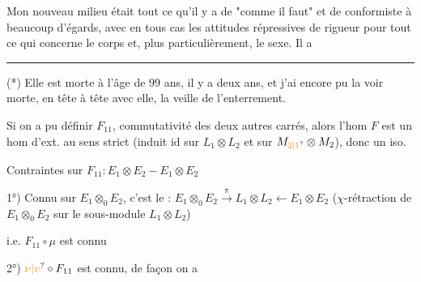 Mon nouveau milieu était tout ce qu'il y a de "comme il faut" et de conformiste à beaucoup d'égards, avec en tous cas les attitudes répressives de rigueur pour tout ce qui concerne le corps et, plus particulièrement, le sexe. Il a 

\noindent\rule{5em}{0.4pt}\par
(*) Elle est morte à l'âge de 99 ans, il y a deux ans, et j'ai encore pu la voir morte, en tête à tête avec elle, la veille de l'enterrement.


Si on a pu définir $F_{11}$,  commutativité des deux autres carrés, alors l'hom $F$ est un hom d'ext. au sens strict (induit $\mathrm{id}$ sur $L_1\otimes L_2$ et sur $M_{\unsure{2|1}}\otimes M_2$), donc  un iso.

Contraintes sur $F_{11}:E_1\otimes E_2 - E_1\otimes E_2$ 

1°) Connu sur $E_1\otimes_0 E_2$, c'est le :
$E_1\otimes_0 E_2\xrightarrow{\pi}L_1\otimes L_2\longleftarrow E_1\otimes E_2$
($\chi$-rétraction de $E_1\otimes_0 E_2$ sur le sous-module $L_1\otimes L_2$)

i.e. $F_{11}\circ\mu$ est connu


2°) $\unsure{\nu|v}\circ F_{11}$ est connu, de façon  on a



